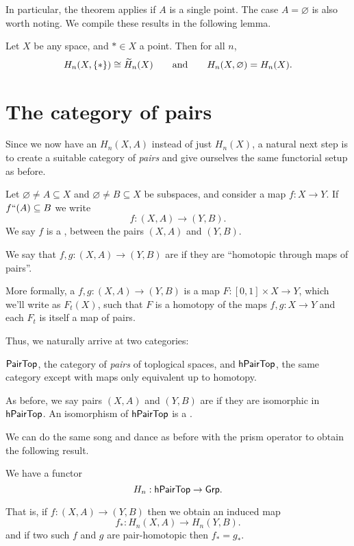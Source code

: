 In particular, the theorem applies if $A$ is a single point.
The case $A = \varnothing$ is also worth noting.
We compile these results in the following lemma.
\begin{lemma}
	Let $X$ be any space, and $\ast \in X$ a point. Then for all $n$,
	\[
		H_n(X, \{\ast\}) \cong \widetilde H_n(X)
		\qquad\text{and}\qquad
		H_n(X, \varnothing) = H_n(X).
	\]
\end{lemma}

\section{The category of pairs}
Since we now have an $H_n(X,A)$ instead of just $H_n(X)$,
a natural next step is to create a suitable category of \emph{pairs}
and give ourselves the same functorial setup as before.

\begin{definition}
	Let $\varnothing \neq A \subseteq X$ and $\varnothing \neq B \subseteq X$
	be subspaces, and consider a map $f : X \to Y$.
	If $f``(A) \subseteq B$ we write
	\[ f : (X,A) \to (Y,B). \]
	We say $f$ is a ,
	between the pairs $(X,A)$ and $(Y,B)$.
\end{definition}
\begin{definition}
	We say that $f,g : (X,A) \to (Y,B)$ are  if they
	are ``homotopic through maps of pairs''.

	More formally, a 
	$f, g : (X,A) \to (Y,B)$ is a map $F : [0,1] \times X \to Y$,
	which we'll write as $F_t(X)$, such that
	$F$ is a homotopy of the maps $f,g : X \to Y$
	and each $F_t$ is itself a map of pairs.
\end{definition}
Thus, we naturally arrive at two categories:
\begin{itemize}
	\ii $\mathsf{PairTop}$, the category of \emph{pairs} of
	toplogical spaces, and
	\ii $\mathsf{hPairTop}$, the same category except
	with maps only equivalent up to homotopy.
\end{itemize}
\begin{definition}
	As before, we say pairs $(X,A)$ and $(Y,B)$ are
	if they are isomorphic in $\mathsf{hPairTop}$.
	An isomorphism of $\mathsf{hPairTop}$ is a
	.
\end{definition}

We can do the same song and dance as before
with the prism operator to obtain the following result.
\begin{lemma}
	We have a functor 
	\[ H_n : \mathsf{hPairTop} \to \mathsf{Grp}. \]
\end{lemma}
That is, if $f : (X,A) \to (Y,B)$ then we obtain an induced map
\[ f_\ast : H_n(X,A) \to H_n(Y,B). \]
and if two such $f$ and $g$ are pair-homotopic
then $f_\ast = g_\ast$.


